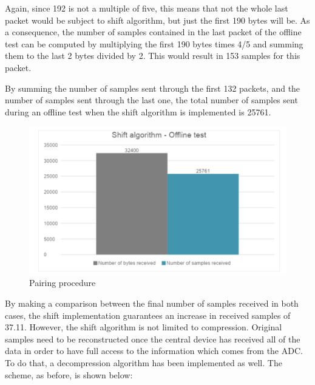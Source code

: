 \documentclass{Configuration_Files/PoliMi3i_thesis}
\begin{document}
Again, since 192 is not a multiple of five, this means that not the whole last packet would be subject to shift algorithm, but just the first 190 bytes will be. As a consequence, the number of samples contained in the last packet of the offline test can be computed by multiplying the first 190 bytes times 4/5 and summing them to the last 2 bytes divided by 2. This would result in 153 samples for this packet.

By summing the number of samples sent through the first 132 packets, and the number of samples sent through the last one, the total number of samples sent during an offline test when the shift algorithm is implemented is 25761.

\begin{figure}[H]
    \centering
    \includegraphics[scale=0.7]{Shift Algorithm/Screenshot 2024-07-22 at 22.31.45.png}
    \caption{Pairing procedure}
    \label{pairing_procedure_5}
\end{figure}

By making a comparison between the final number of samples received in both cases, the shift implementation guarantees an increase in received samples of 37.11. However, the shift algorithm is not limited to compression. Original samples need to be reconstructed once the central device has received all of the data in order to have full access to the information which comes from the ADC. To do that, a decompression algorithm has been implemented as well. The scheme, as before, is shown below:
\end{document}
